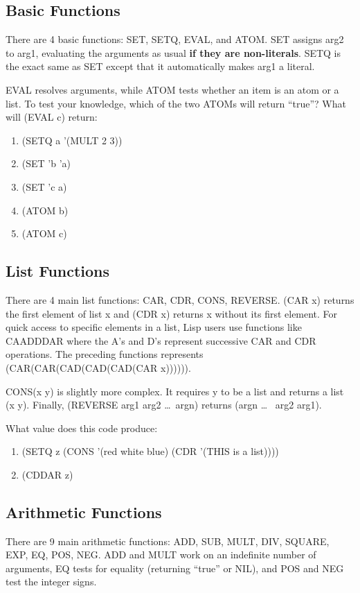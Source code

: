\documentclass[11pt,letterpaper]{article}
\begin{document}
    \subsection{Basic Functions}
    There are 4 basic functions: SET, SETQ, EVAL, and ATOM.
    SET assigns arg2 to arg1, evaluating the arguments as usual
    \textbf{if they are non-literals}.
    SETQ is the exact same as SET except that it automatically makes arg1
    a literal.

    EVAL resolves arguments, while ATOM tests whether an item is an atom or a list.
    To test your knowledge, which of the two ATOMs will return ``true''?
    What will (EVAL c) return:
    \begin{enumerate}
        \item (SETQ a '(MULT 2 3))
        \item (SET 'b 'a)
        \item (SET 'c a)
        \item (ATOM b)
        \item (ATOM c)
    \end{enumerate}

    \subsection{List Functions}
    There are 4 main list functions: CAR, CDR, CONS, REVERSE.
    (CAR x) returns the first element of list x and (CDR x) returns
    x without its first element.
    For quick access to specific elements in a list, Lisp users
    use functions like CAADDDAR where the A's and D's represent successive
    CAR and CDR operations.
    The preceding functions represents (CAR(CAR(CAD(CAD(CAD(CAR x)))))).

    CONS(x y) is slightly more complex.
    It requires y to be a list and returns a list (x y).
    Finally, (REVERSE arg1 arg2 \ldots~argn) returns (argn \ldots~ arg2 arg1).

    What value does this code produce:
    \begin{enumerate}
        \item (SETQ z (CONS '(red white blue) (CDR '(THIS is a list))))
        \item (CDDAR z)
    \end{enumerate}

    \subsection{Arithmetic Functions}
    There are 9 main arithmetic functions: ADD, SUB, MULT, DIV, SQUARE,
    EXP, EQ, POS, NEG.
    ADD and MULT work on an indefinite number of arguments,
    EQ tests for equality (returning ``true'' or NIL),
    and POS and NEG test the integer signs.
\end{document}
